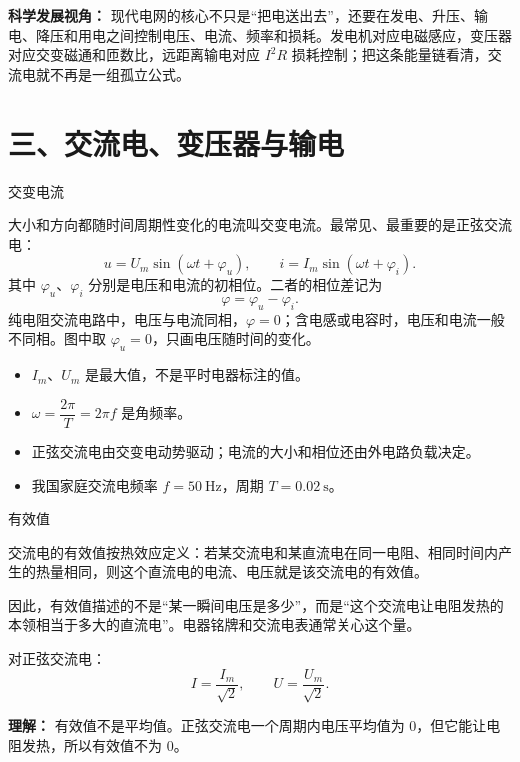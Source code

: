 \textbf{科学发展视角：} 现代电网的核心不只是“把电送出去”，还要在发电、升压、输电、降压和用电之间控制电压、电流、频率和损耗。发电机对应电磁感应，变压器对应交变磁通和匝数比，远距离输电对应 $I^2R$ 损耗控制；把这条能量链看清，交流电就不再是一组孤立公式。

\section*{三、交流电、变压器与输电}

\begin{conceptbox}{交变电流}

大小和方向都随时间周期性变化的电流叫交变电流。最常见、最重要的是正弦交流电：
\[
u=U_m\sin(\omega t+\varphi_u),\qquad
i=I_m\sin(\omega t+\varphi_i).
\]
其中 $\varphi_u$、$\varphi_i$ 分别是电压和电流的初相位。二者的相位差记为
\[
\varphi=\varphi_u-\varphi_i.
\]
纯电阻交流电路中，电压与电流同相，$\varphi=0$；含电感或电容时，电压和电流一般不同相。图中取 $\varphi_u=0$，只画电压随时间的变化。

\begin{center}


\label{fig:ac-sine-effective}
\end{center}

\begin{itemize}
  \item $I_m$、$U_m$ 是最大值，不是平时电器标注的值。
  \item $\omega=\dfrac{2\pi}{T}=2\pi f$ 是角频率。
  \item 正弦交流电由交变电动势驱动；电流的大小和相位还由外电路负载决定。
  \item 我国家庭交流电频率 $f=50\ \mathrm{Hz}$，周期 $T=0.02\ \mathrm{s}$。
\end{itemize}

\end{conceptbox}

\begin{conceptbox}{有效值}

交流电的有效值按热效应定义：若某交流电和某直流电在同一电阻、相同时间内产生的热量相同，则这个直流电的电流、电压就是该交流电的有效值。

因此，有效值描述的不是“某一瞬间电压是多少”，而是“这个交流电让电阻发热的本领相当于多大的直流电”。电器铭牌和交流电表通常关心这个量。

对正弦交流电：
\[
\boxed{I=\frac{I_m}{\sqrt2}},\qquad
\boxed{U=\frac{U_m}{\sqrt2}}.
\]

\textbf{理解：} 有效值不是平均值。正弦交流电一个周期内电压平均值为 0，但它能让电阻发热，所以有效值不为 0。
\end{conceptbox}

